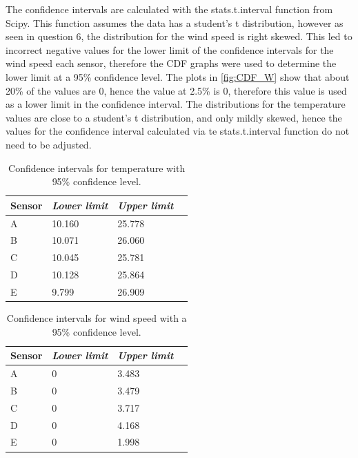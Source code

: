 \documentclass[a4paper,12pt]{article} %
\begin{document}
\begin{enumerate}
The confidence intervals are calculated with the stats.t.interval function from Scipy. This function assumes the data has a student's t distribution, however as seen in question 6, the distribution for the wind speed is right skewed. This led to incorrect negative values for the lower limit of the confidence intervals for the wind speed each sensor, therefore the CDF graphs were used to determine the lower limit at a 95\% confidence level. The plots in \ref{fig:CDF_W} show that about 20\% of the values are 0, hence the value at 2.5\% is 0, therefore this value is used as a lower limit in the confidence interval. The distributions for the temperature values are close to a student's t distribution, and only mildly skewed, hence the values for the confidence interval calculated via te stats.t.interval function do not need to be adjusted. 

\begin{table}[H]
	\centering
	\caption{Confidence intervals for temperature  with 95\% confidence level.}
	\begin{tabular}{llll}
		\multicolumn{1}{c}{\textbf{Sensor}}  & \multicolumn{1}{c}{\textit{Lower limit}} & \textit{Upper limit} \\ \hline
		 A      & 10.160 & 25.778  \\
		B      & 10.071 & 26.060 \\
		C      & 10.045 & 25.781 \\
		D      & 10.128 & 25.864 \\
		E      & 9.799  & 26.909 
	\end{tabular}
\label{CI_T}
\end{table}

\begin{table}[H]
	\centering
	\caption{Confidence intervals for wind speed with a 95\% confidence level.}
	\begin{tabular}{llll}
		\multicolumn{1}{c}{\textbf{Sensor}}  & \multicolumn{1}{c}{\textit{Lower limit}} & \textit{Upper limit} \\ \hline
		 A      & 0              & 3.483 \\
		 B      & 0              & 3.479   \\
		 C      & 0              & 3.717  \\
		 D      & 0              & 4.168  \\
		 E      & 0              & 1.998
	\end{tabular}
\label{CI_WS}
\end{table}


\end{enumerate}
\end{document}
